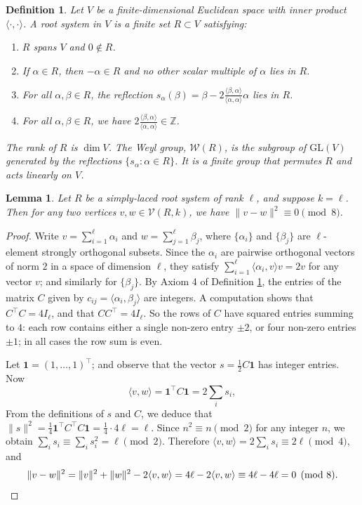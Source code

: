 \documentclass[10pt,a4paper]{amsart}
\newtheorem{definition}{Definition}
\newtheorem{lemma}{Lemma}
\newcommand{\W}{\mathcal{W}}
\begin{document}
\begin{definition}\label{RootDefn}
Let $V$ be a finite-dimensional Euclidean space with inner product $\langle \cdot, \cdot \rangle$.
A \emph{root system} in $V$ is a finite set $R \subset V$ satisfying:
\begin{enumerate}
    \item $R$ spans $V$ and $0 \notin R$.
    \item If $\alpha \in R$, then $-\alpha \in R$ and no other scalar multiple of $\alpha$ lies in $R$.
    \item For all $\alpha, \beta \in R$, the reflection $s_\alpha(\beta) = \beta - 2\frac{\langle \beta, \alpha \rangle}{\langle \alpha, \alpha \rangle}\alpha$ lies in $R$.
    \item For all $\alpha, \beta \in R$, we have $2\frac{\langle \beta, \alpha \rangle}{\langle \alpha, \alpha \rangle} \in \mathbb{Z}$.
\end{enumerate}
The \emph{rank} of $R$ is $\dim V$. The \emph{Weyl group}, $\W(R)$, is the subgroup of $\mathrm{GL}(V)$ generated by the reflections $\{s_\alpha : \alpha \in R\}$. It is a finite group that permutes $R$ and acts linearly on $V$.
\end{definition}

\begin{lemma}\label{lem:mod8}
Let $R$ be a simply-laced root system of rank $\ell$, and suppose $k = \ell$. Then for any two vertices $v, w \in \mathcal{V}(R, k)$, we have $\|v - w\|^2 \equiv 0 \pmod{8}$.
\end{lemma}

\begin{proof}
Write $v = \sum_{i=1}^{\ell} \alpha_i$ and $w = \sum_{j=1}^{\ell} \beta_j$, where $\{\alpha_i\}$ and $\{\beta_j\}$ are $\ell$-element strongly orthogonal subsets. Since the $\alpha_i$ are pairwise orthogonal vectors of norm $2$ in a space of dimension $\ell$, they satisfy $\sum_{i=1}^{\ell} \langle \alpha_{i}, v\rangle v = 2v$ for any vector $v$; and similarly for $\{\beta_j\}$. By Axiom 4 of Definition \ref{RootDefn}, the entries of the matrix  $C$ given by $c_{ij} = \langle \alpha_i, \beta_j \rangle$ are integers. A computation shows that $C^\top C = 4 I_\ell$, and that $CC^\top = 4I_\ell$. 
So the rows of $C$ have squared entries summing to $4$: each row contains either a single non-zero entry $\pm 2$, or four non-zero entries $\pm 1$; in all cases the row sum is even.

Let $\mathbf{1} = (1, \ldots, 1)^\top$; and observe that the vector $s = \frac{1}{2}C\mathbf{1}$ has integer entries. Now
\[
\langle v, w \rangle = \mathbf{1}^\top C \mathbf{1} = 2 \sum_{i} s_{i},
\]
From the definitions of $s$ and $C$, we deduce that $\|s\|^2 = \tfrac{1}{4}\mathbf{1}^\top C^\top C \mathbf{1} = \tfrac{1}{4} \cdot 4\ell = \ell$. 
Since $n^2 \equiv n \pmod{2}$ for any integer $n$, we obtain $\sum_i s_i \equiv \sum_i s_i^2 = \ell \pmod{2}$. Therefore $\langle v, w \rangle = 2\sum_i s_i \equiv 2\ell \pmod{4}$, and
\[
\|v - w\|^2 = \|v\|^2 + \|w\|^2 - 2\langle v, w \rangle = 4\ell - 2\langle v, w \rangle \equiv 4\ell - 4\ell = 0 \pmod{8}. \qedhere
\]
\end{proof}
\end{document}
